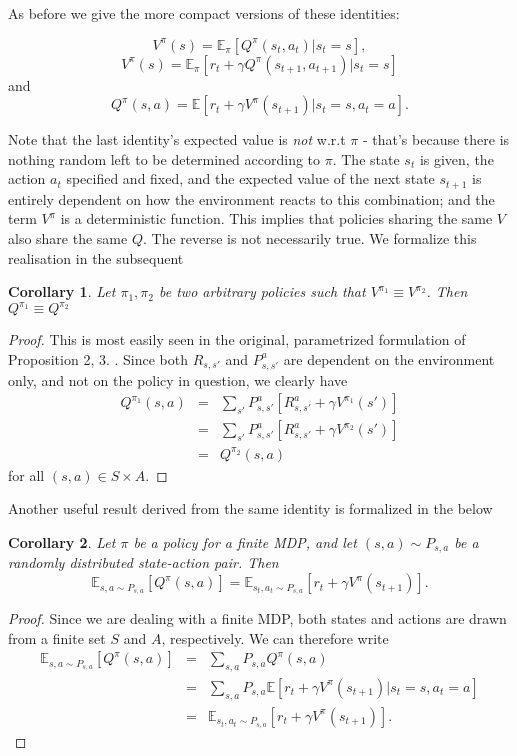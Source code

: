 \documentclass[11pt]{article} %
\newtheorem{cor}{Corollary}
\begin{document}
As before we give the more compact versions of these identities:

$$ V^{\pi}(s) =  \mathbb{E}_{\pi}[Q^{\pi}(s_{t},a_{t}) | s_t = s ], $$
$$ V^{\pi}(s) =  \mathbb{E}_{\pi}[r_t + \gamma Q^{\pi}(s_{t+1},a_{t+1}) | s_t = s ] $$ and 
$$ Q^{\pi}(s,a) = \mathbb{E}[r_t + \gamma V^{\pi}(s_{t+1}) | s_t = s, a_t = a]. $$

Note that the last identity's expected value is \textit{not} w.r.t $\pi$ - that's because there is nothing random left to be determined according to $\pi$. The state $s_t$ is given, the action $a_t$ specified and fixed, and the expected value of the next state $s_{t+1}$ is entirely dependent on how the environment reacts to this combination; and the term $V^{\pi}$ is a deterministic function. This implies that policies sharing the same $V$ also share the same $Q$. The reverse is not necessarily true. We formalize this realisation in the subsequent

\begin{cor}\label{cor_sameVSameQ}
	Let $\pi_1,\pi_2$ be two arbitrary policies such that $V^{\pi_1} \equiv V^{\pi_2}$. Then $Q^{\pi_1} \equiv Q^{\pi_2}$
\end{cor}

\begin{proof}
	This is most easily seen in the original, parametrized formulation of Proposition 2, 3. . Since both $R_{s,s'}$ and $P_{s,s'}^a$ are dependent on the environment only, and not on the policy in question, we clearly have
	\[
		\begin{array}{rll}
			Q^{\pi_1}(s,a) & = &  \sum_{s'} P_{s,s'}^a [ R_{s,s'}^a + \gamma V^{\pi_1}(s') ] \\
						& = & \sum_{s'} P_{s,s'}^a [ R_{s,s'}^a + \gamma V^{\pi_2}(s') ] \\
						& = & Q^{\pi_2}(s,a)
		\end{array}
	\]
	for all $(s,a) \in S \times A$.
\end{proof}

Another useful result derived from the same identity is formalized in the below

\begin{cor}
	Let $\pi$ be a policy for a finite MDP, and let $(s,a) \sim P_{s,a}$ be a randomly distributed state-action pair. Then $$\mathbb{E}_{s, a \sim P_{s,a}}[Q^{\pi}(s,a)] = \mathbb{E}_{s_t, a_t \sim P_{s,a}}[r_t + \gamma V^{\pi}(s_{t+1})].$$
\end{cor}

\begin{proof}
	Since we are dealing with a finite MDP, both states and actions are drawn from a finite set $S$ and $A$, respectively. We can therefore write
	\[
		\begin{array}{rll}
			\mathbb{E}_{s,a \sim  P_{s,a}}[Q^{\pi}(s,a)] 	& = & \sum_{s,a} P_{s,a} Q^{\pi}(s,a) \\
				& = & \sum_{s,a} P_{s,a} \mathbb{E}[r_t + \gamma V^{\pi}(s_{t+1}) | s_t = s, a_t = a] \\
				& = & \mathbb{E}_{s_t,a_t \sim P_{s,a}}[r_t + \gamma V^{\pi}(s_{t+1})].
		\end{array}
	\]
\end{proof}
\end{document}
